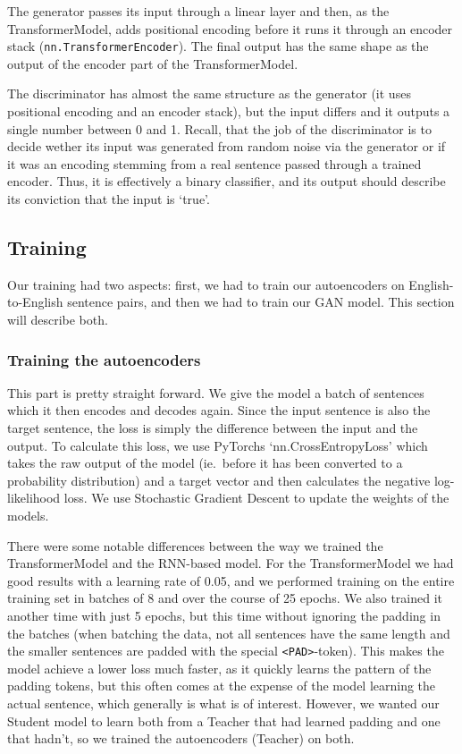 \documentclass{article}
\begin{document}
The generator passes its input through a linear layer and then, as the
TransformerModel, adds positional encoding before it runs it through an encoder
stack (\texttt{nn.TransformerEncoder}). The final output has the same shape as
the output of the encoder part of the TransformerModel.

The discriminator has almost the same structure as the generator (it uses
positional encoding and an encoder stack), but the input differs and it outputs
a single number between 0 and 1. Recall, that the job of the discriminator is to
decide wether its input was generated from random noise via the generator or if
it was an encoding stemming from a real sentence passed through a trained
encoder. Thus, it is effectively a binary classifier, and its output should
describe its conviction that the input is `true'.

\subsection{Training}\label{sec:training}

Our training had two aspects: first, we had to train our autoencoders on
English-to-English sentence pairs, and then we had to train our GAN model. This
section will describe both.

\subsubsection{Training the autoencoders}

This part is pretty straight forward. We give the model a batch of sentences
which it then encodes and decodes again. Since the input sentence is also the
target sentence, the loss is simply the difference between the input and the
output. To calculate this loss, we use PyTorchs `nn.CrossEntropyLoss' which
takes the raw output of the model (ie.\ before it has been converted to a
probability distribution) and a target vector and then calculates the negative
log-likelihood loss. We use Stochastic Gradient Descent to update the weights of
the models.

There were some notable differences between the way we trained the
TransformerModel and the RNN-based model. For the TransformerModel we had good
results with a learning rate of 0.05, and we performed training on the entire
training set in batches of 8 and over the course of 25 epochs. We also trained
it another time with just 5 epochs, but this time without ignoring the padding
in the batches (when batching the data, not all sentences have the same length
and the smaller sentences are padded with the special \texttt{<PAD>}-token).
This makes the model achieve a lower loss much faster, as it quickly learns the
pattern of the padding tokens, but this often comes at the expense of the model
learning the actual sentence, which generally is what is of interest. However,
we wanted our Student model to learn both from a Teacher that had learned
padding and one that hadn't, so we trained the autoencoders (Teacher) on both.
\end{document}
